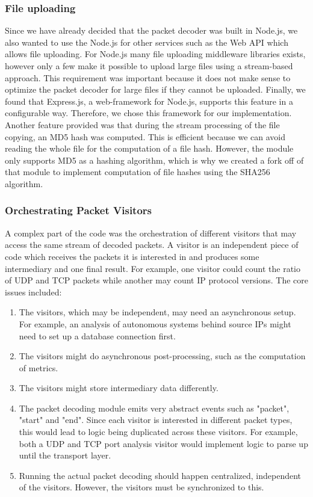 \subsubsection{File uploading}
Since we have already decided that the packet decoder was built in Node.js, we also wanted to use the Node.js for other services such as the Web API which allows file uploading. For Node.js many file uploading middleware libraries exists, however only a few make it possible to upload large files using a stream-based approach. This requirement was important because it does not make sense to optimize the packet decoder for large files if they cannot be uploaded. Finally, we found that Express.js, a web-framework for Node.js, supports this feature in a configurable way. Therefore, we chose this framework for our implementation. Another feature provided was that during the stream processing of the file copying, an MD5 hash was computed. This is efficient because we can avoid reading the whole file for the computation of a file hash. However, the module only supports MD5 as a hashing algorithm, which is why we created a fork off of that module to implement computation of file hashes using the SHA256 algorithm. 

\subsubsection{Orchestrating Packet Visitors}\label{orchestratingpacketvisitors}
A complex part of the code was the orchestration of different visitors that may access the same stream of decoded packets. A visitor is an independent piece of code which receives the packets it is interested in and produces some intermediary and one final result. For example, one visitor could count the ratio of UDP and TCP packets while another may count IP protocol versions. The core issues included:

\begin{enumerate}
    \item The visitors, which may be independent, may need an asynchronous setup. For example, an analysis of autonomous systems behind source IPs might need to set up a database connection first.
    \item The visitors might do asynchronous post-processing, such as the computation of metrics.
    \item The visitors might store intermediary data differently.
    \item The packet decoding module emits very abstract events such as "packet", "start" and "end". Since each visitor is interested in different packet types, this would lead to logic being duplicated across these visitors. For example, both a UDP and TCP port analysis visitor would implement logic to parse up until the transport layer.
    \item Running the actual packet decoding should happen centralized, independent of the visitors. However, the visitors must be synchronized to this.
\end{enumerate}{}

